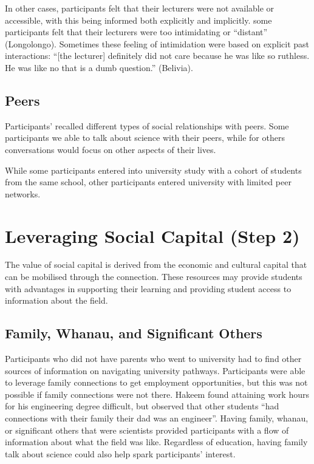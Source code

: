 In other cases, participants felt that their lecturers were not available or accessible, with this being informed both explicitly and implicitly. some participants felt that their lecturers were too intimidating or ``distant'' (Longolongo). Sometimes these feeling of intimidation were based on explicit past interactions: ``[the lecturer] definitely did not care because he was like so ruthless. He was like no that is a dumb question.'' (Belivia).



\subsection{Peers}
Participants' recalled different types of social relationships with peers. Some participants we able to talk about science with their peers, while for others conversations would focus on other aspects of their lives. 

While some participants entered into university study with a cohort of students from the same school, other participants entered university with limited peer networks.  


\section{Leveraging Social Capital (Step 2)}
The value of social capital is derived from the economic and cultural capital that can be mobilised through the connection. These resources may provide students with advantages in supporting their learning and providing student access to information about the field. 

\subsection{Family, Whanau, and Significant Others}
Participants who did not have parents who went to university had to find other sources of information on navigating university pathways. Participants were able to leverage family connections to get employment opportunities, but this was not possible if family connections were not there. Hakeem found attaining work hours for his engineering degree difficult, but observed that other students ``had connections with their family their dad was an engineer''. Having family, whanau, or significant others that were scientists provided participants with a flow of information about what the field was like. Regardless of education, having family talk about science could also help spark participants' interest. 

